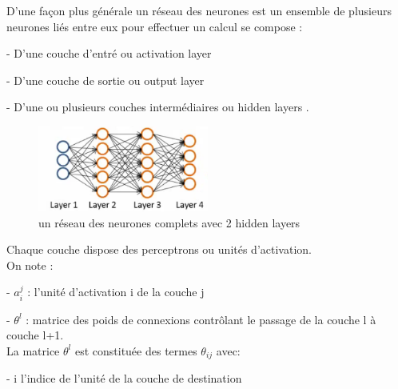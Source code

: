 D'une façon plus générale un  réseau des neurones est un ensemble de plusieurs neurones liés entre eux pour effectuer un calcul se compose :

- D'une couche d'entré ou activation layer 

- D'une couche de sortie ou output layer  

- D'une ou plusieurs couches intermédiaires ou hidden layers .

\begin{figure}[ht]
	\centering
	\includegraphics[width=0.5\textwidth]{fig/FullNeural.png}
	\caption[Short caption]{un réseau des neurones complets avec 2 hidden layers }
	\label{fig:image11}
\end{figure}

Chaque couche dispose des perceptrons ou unités d'activation.\\
On note :

 - ${a}_{i}^{j}$ : l'unité d'activation i de la couche j
 
 
 - ${\theta}^{l}$ : matrice des poids de connexions contrôlant le passage de la couche l à couche l+1.\\
 La matrice ${\theta}^{l}$ est constituée des termes ${\theta}_{ij}$ avec:
 
 - i l'indice de l'unité de la couche de destination
 
